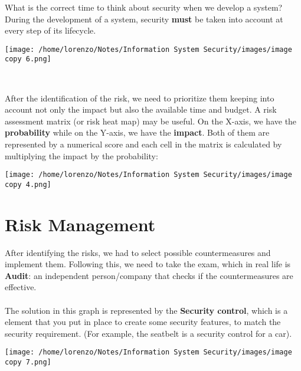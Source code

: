     \begin{quotebox-grey}{What is the correct time to think about security when we develop a system?}
        During the development of a system, security \textbf{must} be taken into account at every step of its lifecycle. 
        \\
            \begin{center}
                \texttt{[image: /home/lorenzo/Notes/Information System Security/images/image copy 6.png]}
            \end{center}
    \end{quotebox-grey}
    
    \noindent
    \\
    \begin{minipage}{0.6\textwidth}
        After the identification of the risk, we need to prioritize them keeping into account not only the impact but also the available time and budget. 
        A risk assessment matrix (or risk heat map) may be useful. On the X-axis, we have the \textbf{probability} while on the Y-axis, we have the \textbf{impact}. Both of them are represented by a numerical score and each cell in the matrix is calculated by multiplying the impact by the probability:
    \end{minipage} 
    \hspace{0.2cm}
    \begin{minipage}{0.4\textwidth}
            \centering
            \texttt{[image: /home/lorenzo/Notes/Information System Security/images/image copy 4.png]}
    \end{minipage}

\section{Risk Management}
\begin{minipage}{0.5\textwidth}
	\vspace{-1.0cm}
After identifying the risks, we had to select possible countermeasures and implement them. Following this, we need to take the exam, which in real life is \textbf{Audit}: an independent person/company that checks if the countermeasures are effective.\\
\\
The solution in this graph is represented by the \textbf{Security control},
which is a element that you put in place to create some security
features, to match the security requirement. (For example, the
seatbelt is a security control for a car).
\end{minipage} 
\hspace{0.3cm}
\begin{minipage}{0.5\textwidth}
    
\texttt{[image: /home/lorenzo/Notes/Information System Security/images/image copy 7.png]}
\end{minipage}

